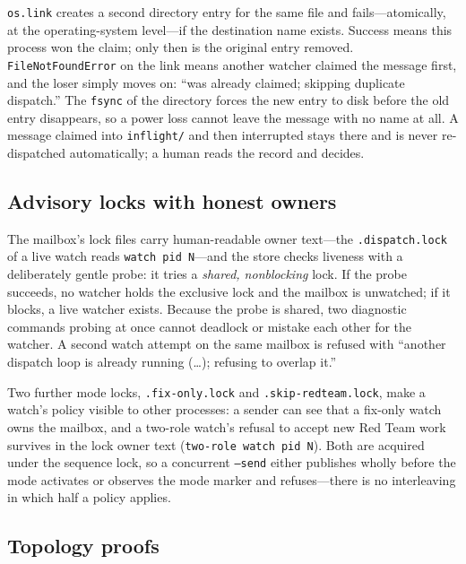 \documentclass[10pt,aps,prd,twocolumn,nofootinbib]{revtex4-2}
\newcommand{\code}[1]{\texttt{#1}}
\newcommand{\file}[1]{\texttt{#1}}
\begin{document}
\code{os.link} creates a second directory entry for the same file and
fails---atomically, at the operating-system level---if the destination
name exists.  Success means this process won the claim; only then is
the original entry removed.  \code{FileNotFoundError} on the link
means another watcher claimed the message first, and the loser simply
moves on: ``was already claimed; skipping duplicate dispatch.''  The
\code{fsync} of the directory forces the new entry to disk before the
old entry disappears, so a power loss cannot leave the message with no
name at all.  A message claimed into \file{inflight/} and then
interrupted stays there and is never re-dispatched automatically; a
human reads the record and decides.

\subsection{Advisory locks with honest owners}

The mailbox's lock files carry human-readable owner text---the
\file{.dispatch.lock} of a live watch reads \code{watch pid N}---and
the store checks liveness with a deliberately gentle probe: it tries a
\emph{shared, nonblocking} lock.  If the probe succeeds, no watcher
holds the exclusive lock and the mailbox is unwatched; if it blocks,
a live watcher exists.  Because the probe is shared, two diagnostic
commands probing at once cannot deadlock or mistake each other for
the watcher.  A second watch attempt on the same mailbox is refused
with ``another dispatch loop is already running (\dots); refusing to
overlap it.''

Two further mode locks, \file{.fix-only.lock} and
\file{.skip-redteam.lock}, make a watch's policy visible to other
processes: a sender can see that a fix-only watch owns the mailbox,
and a two-role watch's refusal to accept new Red Team work survives
in the lock owner text (\code{two-role watch pid N}).  Both are
acquired under the sequence lock, so a concurrent \code{--send}
either publishes wholly before the mode activates or observes the
mode marker and refuses---there is no interleaving in which half a
policy applies.

\subsection{Topology proofs}
\end{document}
